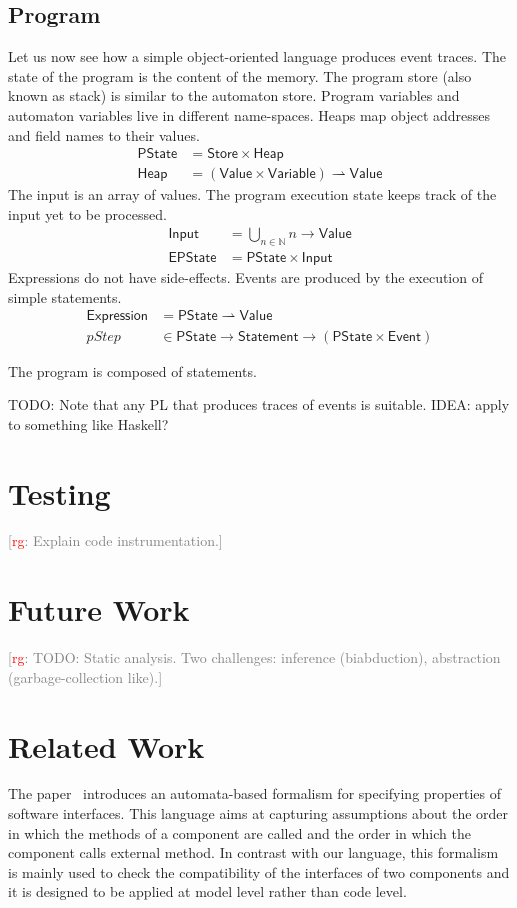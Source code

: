 \documentclass[preprint]{sigplanconf} %
\newcommand{\note}[2]{\textcolor{gray}{[\textcolor{red}{#1}: #2]}}
\newcommand{\rg}[1]{\note{rg}{#1}}
\newcommand{\N}{\ensuremath{\mathbb{N}}}
\newcommand{\pmap}{\rightharpoonup}
\newcommand{\set}[1]{\ensuremath{\mathsf{#1}}}
\theoremstyle{definition}
\begin{document}
\subsection{Program} %

Let us now see how a simple object-oriented language produces event traces.
The state of the program is the content of the memory.
The program store (also known as stack) is similar to the automaton store.
Program variables and automaton variables live in different name-spaces.
Heaps map object addresses and field names to their values.
\begin{align}
\set{PState}&=\set{Store}\times\set{Heap}\\
\set{Heap}&=(\set{Value}\times\set{Variable})\pmap\set{Value}
\end{align}
The input is an array of values.
The program execution state keeps track of the input yet to be processed.
\begin{align}
\set{Input}&=\bigcup_{n\in\N}n\to\set{Value}\\
\set{EPState}&=\set{PState}\times\set{Input}
\end{align}
Expressions do not have side-effects.
Events are produced by the execution of simple statements.
\begin{align}
\set{Expression}&=\set{PState}\pmap\set{Value} \\
\mathit{pStep}&\in\set{PState}\to\set{Statement}\to(\set{PState}\times\set{Event})
\end{align}


The program is composed of statements.



TODO: Note that any PL that produces traces of events is suitable.
IDEA: apply to something like Haskell?

\section{Testing}\label{sec:testing} %

\rg{Explain code instrumentation.}


\section{Future Work}\label{sec:future} %

\rg{TODO: Static analysis.
Two challenges: inference (biabduction), abstraction (garbage-collection like).}

\section{Related Work}\label{sec:related} %
The paper~\cite{DBLP:conf/sigsoft/AlfaroH01} introduces an automata-based formalism for specifying properties of software interfaces. 
This language aims at capturing assumptions about the order in which the methods of a component are called and the order in which the component calls external method. 
In contrast with our language, this formalism is mainly used to check the compatibility of the interfaces of two components and it is designed to be applied at  model level rather than code level.
\end{document}
